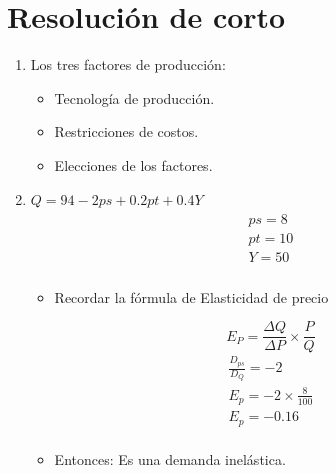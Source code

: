 \section{Resolución de corto}
\begin{enumerate}
    
    \item Los tres factores de producción:
        \begin{itemize}
            \item Tecnología de producción. 
            \item Restricciones de costos.
            \item Elecciones de los factores.
        \end{itemize}
    
    \item $Q = 94-2ps+0.2pt+0.4Y$
        \begin{align*}
            \begin{matrix}
                ps=8 \\ 
                pt=10 \\ 
                Y=50 \\ 
            \end{matrix}
        \end{align*}
        \begin{itemize}
            \item Recordar la fórmula de Elasticidad de precio
        \end{itemize}
        \[
            E_P = \frac{\Delta Q}{\Delta P} \times \frac{P}{Q} 
        \]
        \begin{align*}
            \frac{D_{ps}}{D_Q} = -2 \\ 
            E_p = -2 \times \frac{8}{100}  \\ 
            E_p = -0.16 \\ 
        \end{align*}
        \begin{itemize}
            \item Entonces: Es una demanda inelástica.
        \end{itemize}
    

\end{enumerate}

